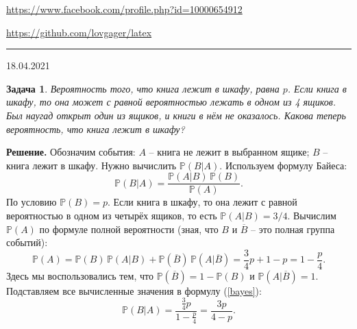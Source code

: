 \documentclass[12pt]{article}
\begin{document}


\begin{flushleft}
\url{https://www.facebook.com/profile.php?id=10000654912}

\url{https://github.com/lovgager/latex}
\end{flushleft}
\hrule 
\begin{flushright}
18.04.2021
\end{flushright}
\bigskip


\newtheorem*{task}{Задача}
\begin{task}
Вероятность того, что книга лежит в шкафу, равна $p$. Если книга в шкафу, то она может с равной вероятностью лежать в одном из 4 ящиков. Был наугад открыт один из ящиков, и книги в нём не оказалось. Какова теперь вероятность, что книга лежит в шкафу?
\end{task}

\noindent\textbf{Решение.} 
Обозначим события: $A$ -- книга не лежит в выбранном ящике; $B$ -- книга лежит в шкафу. Нужно вычислить $\mathbb{P}(B|A).$ Используем формулу Байеса:
\begin{equation}\label{bayes}
    \mathbb{P}(B|A) = \frac{\mathbb{P}(A|B)\,\mathbb{P}(B)} {\mathbb{P}(A)}.
\end{equation}
По условию $\mathbb{P}(B) = p$. Если книга в шкафу, то она лежит с равной вероятностью в одном из четырёх ящиков, то есть $\mathbb{P}(A|B) = 3/4$. Вычислим $\mathbb{P}(A)$ по формуле полной вероятности (зная, что $B$ и $\overline{B}$ -- это полная группа событий):
\begin{equation*}
    \mathbb{P}(A) = \mathbb{P}(B)\,\mathbb{P}(A|B) + \mathbb{P}(\overline{B})\, \mathbb{P}(A|\overline{B}) = \frac{3}{4}p + 1 - p = 1 - \frac{p}{4}.
\end{equation*}
Здесь мы воспользовались тем, что $\mathbb{P}(\overline{B}) = 1 - \mathbb{P}(B)$ и $\mathbb{P}(A|\overline{B}) = 1$. Подставляем все вычисленные значения в формулу (\ref{bayes}):
\begin{equation*}
    \mathbb{P}(B|A) = \frac{\displaystyle\frac{3}{4}p}{1 - \displaystyle\frac{p}{4}} = \frac{3p}{4-p}.
\end{equation*}
\end{document}

